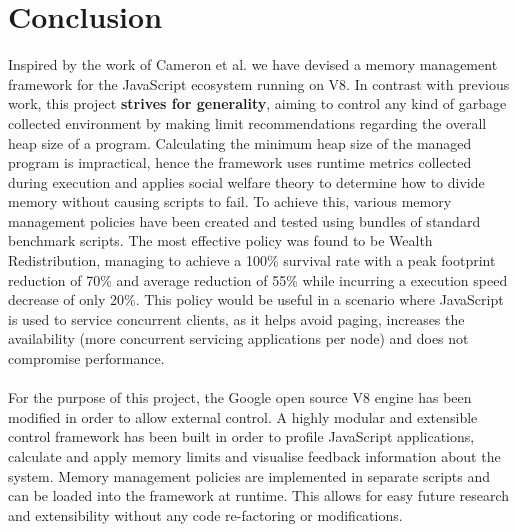 \documentclass{l4proj}
\begin{document}
\chapter{Conclusion}
\hspace*{1em} Inspired by the work of Cameron et al.\cite{forseti} we have devised a memory management framework for the JavaScript ecosystem running on V8. In contrast with previous work, this project \textbf{strives for generality}, aiming to control any kind of garbage collected environment by making limit recommendations regarding the overall heap size of a program. Calculating the minimum heap size of the managed program is impractical, hence the framework uses runtime metrics collected during execution and applies social welfare theory to determine how to divide memory without causing scripts to fail. To achieve this, various memory management policies have been created and tested using bundles of standard benchmark scripts. The most effective policy was found to be Wealth Redistribution, managing to achieve a 100\% survival rate with a peak footprint reduction of 70\% and average reduction of 55\% while incurring a execution speed decrease of only 20\%. This policy would be useful in a scenario where JavaScript is used to service concurrent clients, as it helps avoid paging, increases the availability (more concurrent servicing applications per node) and does not compromise performance.
\\\\
\hspace*{1em} For the purpose of this project, the Google open source V8 engine has been modified in order to allow external control. A highly modular and extensible control framework has been built in order to profile JavaScript applications, calculate and apply memory limits and visualise feedback information about the system. Memory management policies are implemented in separate scripts and can be loaded into the framework at runtime. This allows for easy future research and extensibility without any code re-factoring or modifications. 
\end{document}
